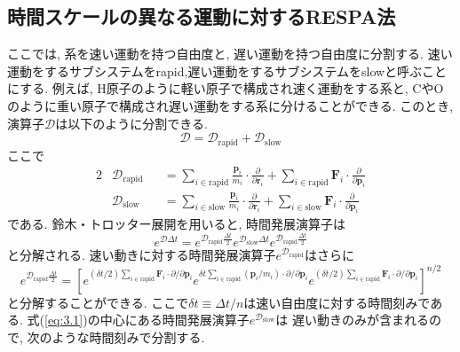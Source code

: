 \subsection{時間スケールの異なる運動に対するRESPA法}
ここでは, 系を速い運動を持つ自由度と, 遅い運動を持つ自由度に分割する. 
速い運動をするサブシステムをrapid,遅い運動をするサブシステムをslowと呼ぶことにする. 
例えば, H原子のように軽い原子で構成され速く運動をする系と, 
CやOのように重い原子で構成され遅い運動をする系に分けることができる. 
このとき, 演算子$\mathcal{D}$は以下のように分割できる. 
\begin{equation}
 \mathcal{D} = \mathcal{D}_{\mathrm{rapid}} + \mathcal{D}_{\mathrm{slow}}
\end{equation}
ここで
\begin{alignat}{2}
 &\mathcal{D}_{\mathrm{rapid}}
 &&= \sum_{i \in \mathrm{rapid}} \frac{\bm{p}_{i}}{m_{i}}
     \cdot \frac{\partial}{\partial \bm{r}_{i}}
   + \sum_{i \in \mathrm{rapid}} \bm{F}_{i}
     \cdot \frac{\partial}{\partial \bm{p}_{i}}  \\
 &\mathcal{D}_{\mathrm{slow}}
 &&= \sum_{i \in \mathrm{slow}} \frac{\bm{p}_{i}}{m_{i}}
     \cdot \frac{\partial}{\partial \bm{r}_{i}}
   + \sum_{i \in \mathrm{slow}} \bm{F}_{i}
     \cdot \frac{\partial}{\partial \bm{p}_{i}}
\end{alignat}
である. 鈴木・トロッター展開を用いると, 時間発展演算子は
\begin{equation}
 e^{\mathcal{D} \Delta t}
  = e^{\mathcal{D}_{\mathrm{rapid}} \frac{\Delta t}{2}}
    e^{\mathcal{D}_{\mathrm{slow}}  \Delta t}
    e^{\mathcal{D}_{\mathrm{rapid}} \frac{\Delta t}{2}}
 \label{eq:3.1}
\end{equation}
と分解される. 速い動きに対する時間発展演算子$e^{\mathcal{D}_{\mathrm{rapid}}}$はさらに
\begin{equation}
 e^{\mathcal{D}_{\mathrm{rapid}} \frac{\Delta t}{2}}
  = \left[
     e^{
     (\delta t/2) \sum_{i \in \mathrm{rapid}} \bm{F}_{i}
     \cdot \partial/\partial \bm{p}_{i}
      }
     e^{
     \delta t \sum_{i \in \mathrm{rapid}} (\bm{p}_{i}/m_{i})
     \cdot \partial/\partial \bm{p}_{i}
      }
     e^{
     (\delta t/2) \sum_{i \in \mathrm{rapid}} \bm{F}_{i}
     \cdot \partial/\partial \bm{p}_{i}
     }
    \right]^{n/2}
 \label{eq:3.2}
\end{equation}
と分解することができる. 
ここで$\delta t \equiv \Delta t/n$は速い自由度に対する時間刻みである. 
式(\ref{eq:3.1})の中心にある時間発展演算子$e^{\mathcal{D}_{\mathrm{slow}}}$は
遅い動きのみが含まれるので, 次のような時間刻みで分割する. 
